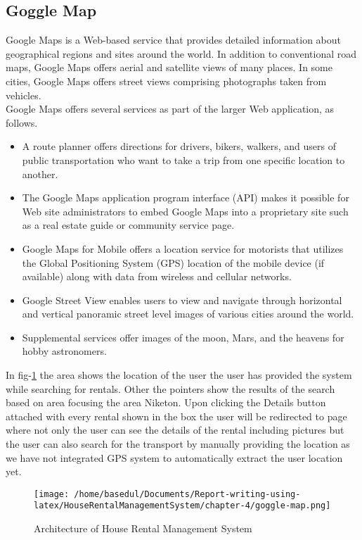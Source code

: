 \documentclass[12pt,a4paper]{report}
\newcommand\tab[1][0cm]{\hspace*{#1}}
\begin{document}
	\subsection{Goggle Map}
		\tab Google Maps\cite{Ref:19} is a Web-based service that provides detailed information about geographical regions and sites around the world. In addition to conventional road maps, Google Maps offers aerial and satellite views of many places. In some cities, Google Maps offers street views comprising photographs taken from vehicles.\\Google Maps offers several services as part of the larger Web application, as follows.
		\begin{itemize}
			\item A route planner offers directions for drivers, bikers, walkers, and users of public transportation who want to take a trip from one specific location to another.
			\item The Google Maps application program interface (API) makes it possible for Web site administrators to embed Google Maps into a proprietary site such as a real estate guide or community service page.
			\item Google Maps for Mobile offers a location service for motorists that utilizes the Global Positioning System (GPS) location of the mobile device (if available) along with data from wireless and cellular networks.
			\item Google Street View enables users to view and navigate through horizontal and vertical panoramic street level images of various cities around the world.
			\item Supplemental services offer images of the moon, Mars, and the heavens for hobby astronomers.
		\end{itemize}
In fig-\ref{fig:map} the area shows the location of the user the user has provided the system while searching for rentals. Other the pointers show the results of the search based on area focusing the area Niketon.
Upon clicking the Details button attached with every rental shown in the box the user will be redirected
to page where not only the user can see the details of the rental including pictures but the user can also
search for the transport by manually providing the location as we have not integrated GPS system to
automatically extract the user location yet.
	\begin{figure}[H]
		\centering
		\texttt{[image: /home/basedul/Documents/Report-writing-using-latex/HouseRentalManagementSystem/chapter-4/goggle-map.png]}
		\caption{\hspace{0.35em}Architecture of House Rental Management System}
		\label{fig:map} 
	\end{figure}
	
\end{document}
